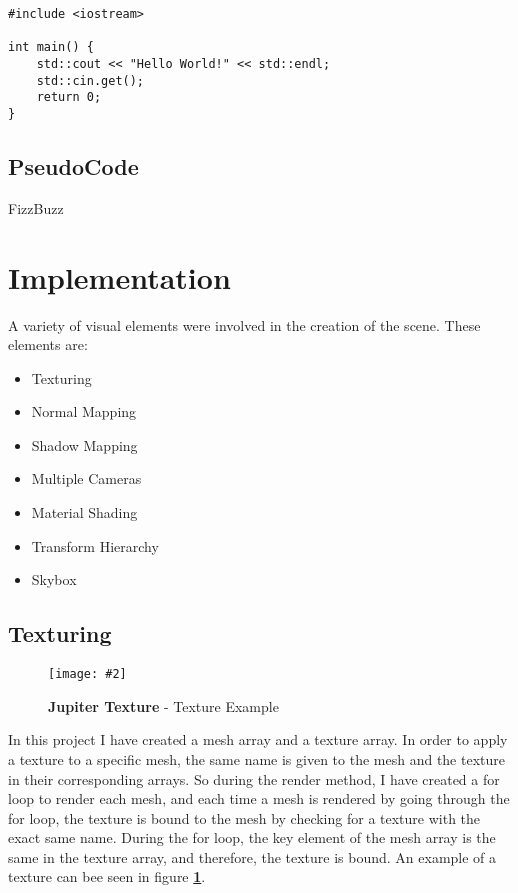 \documentclass[10pt, a4paper]{article}
\newcommand{\figuremacro}[5]{
    \begin{figure}[#1]
        \centering
        \texttt{[image: \#2]}
        \caption[#3]{\textbf{#3}#4}
        \label{fig:#2}
    \end{figure}
}
\begin{document}
\begin{lstlisting}[caption = Hello World! in c++]
#include <iostream>

int main() {
    std::cout << "Hello World!" << std::endl;
    std::cin.get();
    return 0;
}
\end{lstlisting}


    
\subsection{PseudoCode}

\begin{algorithm}[h]
\caption{FizzBuzz}
\end{algorithm}

	\fi
	
	

	
	
\section{Implementation}
	A variety of visual elements were involved in the creation of the scene. These elements are:
	\begin{itemize}
		\item Texturing
		\item Normal Mapping
		\item Shadow Mapping
		\item Multiple Cameras
		\item Material Shading
		\item Transform Hierarchy
		\item Skybox
		
	\end{itemize}
\newpage
\subsection{Texturing}

	\figuremacro{H}{Jupiter}{Jupiter Texture}{ - Texture Example}{1.0}

	In this project I have created a mesh array and a texture array. In order to apply a texture to a specific mesh, the same name is given to the mesh and the texture in their corresponding arrays. So during the render method, I have created a for loop to render each mesh, and each time a mesh is rendered by going through the for loop, the texture is bound to the mesh by checking for a texture with the exact same name. During the for loop, the key element of the mesh array is the same in the texture array, and therefore, the texture is bound. An example of a texture can bee seen in figure \textbf{\ref{fig:Jupiter}}.
\end{document}
